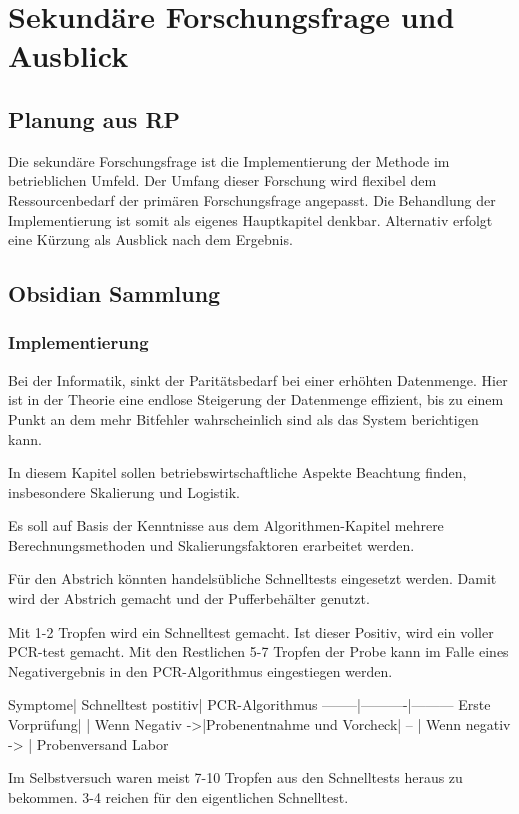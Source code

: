 \chapter{Sekundäre Forschungsfrage und Ausblick}


\section{Planung aus RP}
Die sekundäre Forschungsfrage ist die Implementierung der Methode im betrieblichen Umfeld.
Der Umfang dieser Forschung wird flexibel dem Ressourcenbedarf der primären Forschungsfrage angepasst.
Die Behandlung der Implementierung ist somit als eigenes Hauptkapitel denkbar.
Alternativ erfolgt eine Kürzung als Ausblick nach dem Ergebnis.

\section{Obsidian Sammlung}
\subsection{Implementierung}
Bei der Informatik, sinkt der Paritätsbedarf bei einer erhöhten Datenmenge.
Hier ist in der Theorie eine endlose Steigerung der Datenmenge effizient, bis zu einem Punkt an dem mehr Bitfehler wahrscheinlich sind als das System berichtigen kann.

In diesem Kapitel sollen betriebswirtschaftliche Aspekte Beachtung finden, insbesondere Skalierung und Logistik.

Es soll auf Basis der Kenntnisse aus dem Algorithmen-Kapitel mehrere Berechnungsmethoden und Skalierungsfaktoren erarbeitet werden.

Für den Abstrich könnten handelsübliche Schnelltests eingesetzt werden. Damit wird der Abstrich gemacht und der Pufferbehälter genutzt.

Mit 1-2 Tropfen wird ein Schnelltest gemacht. Ist dieser Positiv, wird ein voller PCR-test gemacht. Mit den Restlichen 5-7 Tropfen der Probe kann im Falle eines Negativergebnis in den PCR-Algorithmus eingestiegen werden.

Symptome| Schnelltest postitiv| PCR-Algorithmus
--------|----------|---------
Erste Vorprüfung| |
Wenn Negativ ->|Probenentnahme und Vorcheck|
-- | Wenn negativ -> | Probenversand Labor

Im Selbstversuch waren meist 7-10 Tropfen aus den Schnelltests heraus zu bekommen. 3-4 reichen für den eigentlichen Schnelltest.
\fi